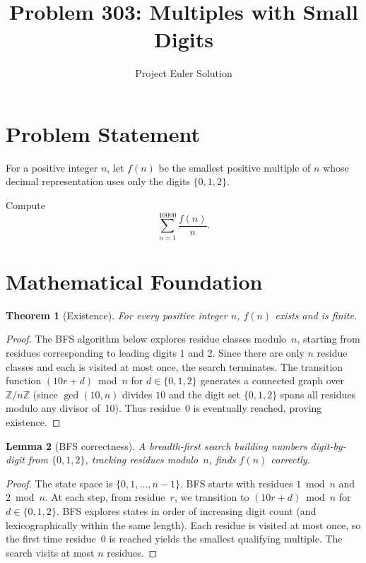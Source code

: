 \documentclass[12pt]{article}
\title{Problem 303: Multiples with Small Digits}
\author{Project Euler Solution}
\date{}
\newtheorem{theorem}{Theorem}
\newtheorem{lemma}[theorem]{Lemma}
\begin{document}
\maketitle

\section{Problem Statement}
For a positive integer $n$, let $f(n)$ be the smallest positive multiple of $n$ whose decimal representation uses only the digits $\{0, 1, 2\}$.

Compute
\[
\sum_{n=1}^{10000} \frac{f(n)}{n}.
\]

\section{Mathematical Foundation}

\begin{theorem}[Existence]\label{thm:existence}
For every positive integer $n$, $f(n)$ exists and is finite.
\end{theorem}

\begin{proof}
The BFS algorithm below explores residue classes modulo~$n$, starting from residues corresponding to leading digits 1 and 2. Since there are only $n$ residue classes and each is visited at most once, the search terminates. The transition function $(10r + d) \bmod n$ for $d \in \{0,1,2\}$ generates a connected graph over $\mathbb{Z}/n\mathbb{Z}$ (since $\gcd(10, n)$ divides $10$ and the digit set $\{0,1,2\}$ spans all residues modulo any divisor of~10). Thus residue~0 is eventually reached, proving existence.
\end{proof}

\begin{lemma}[BFS correctness]\label{lem:bfs}
A breadth-first search building numbers digit-by-digit from $\{0,1,2\}$, tracking residues modulo~$n$, finds $f(n)$ correctly.
\end{lemma}

\begin{proof}
The state space is $\{0, 1, \ldots, n-1\}$. BFS starts with residues $1 \bmod n$ and $2 \bmod n$. At each step, from residue~$r$, we transition to $(10r + d) \bmod n$ for $d \in \{0,1,2\}$. BFS explores states in order of increasing digit count (and lexicographically within the same length). Each residue is visited at most once, so the first time residue~0 is reached yields the smallest qualifying multiple. The search visits at most $n$ residues.
\end{proof}
\end{document}
